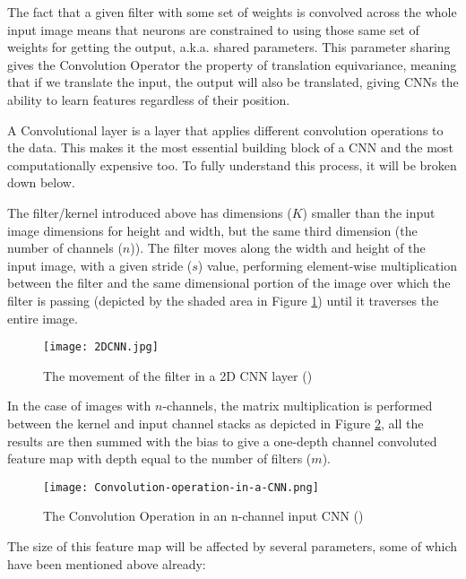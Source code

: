 The fact that a given filter with some set of weights is convolved across the whole input image means that neurons are constrained to using those same set of weights for getting the output, \gls{a.k.a.} shared parameters. This parameter sharing gives the Convolution Operator the property of translation equivariance, meaning that if we translate the input, the output will also be translated, giving \gls{CNN}s the ability to learn features regardless of their position.

A Convolutional layer is a layer that applies different convolution operations to the data. This makes it the most essential building block of a \gls{CNN} and the most computationally expensive too. To fully understand this process, it will be broken down below.

The filter/kernel introduced above has dimensions ($K$) smaller than the input image dimensions for height and width, but the same third dimension (the number of channels ($n$)). The filter moves along the width and height of the input image, with a given stride ($s$) value, performing element-wise multiplication between the filter and the same dimensional portion of the image over which the filter is passing (depicted by the shaded area in Figure \ref{fig_cnn_filter}) until it traverses the entire image.

    \begin{figure}[hbt!]
        \centering
        \texttt{[image: 2DCNN.jpg]}
        \caption{The movement of the filter in a 2D CNN layer (\cite{2dcnnpic})}
        \label{fig_cnn_filter}
    \end{figure}
     
In the case of images with $n$-channels, the matrix multiplication is performed between the kernel and input channel stacks as depicted in Figure \ref{fig_cnn_conv}, all the results are then summed with the bias to give a one-depth channel convoluted feature map with depth equal to the number of filters ($m$).

    \begin{figure}[hbt!]
        \centering
        \texttt{[image: Convolution-operation-in-a-CNN.png]}
        \caption{The Convolution Operation in an n-channel input CNN (\cite{9053228})}
        \label{fig_cnn_conv}
    \end{figure}
      
The size of this feature map will be affected by several parameters, some of which have been mentioned above already:

